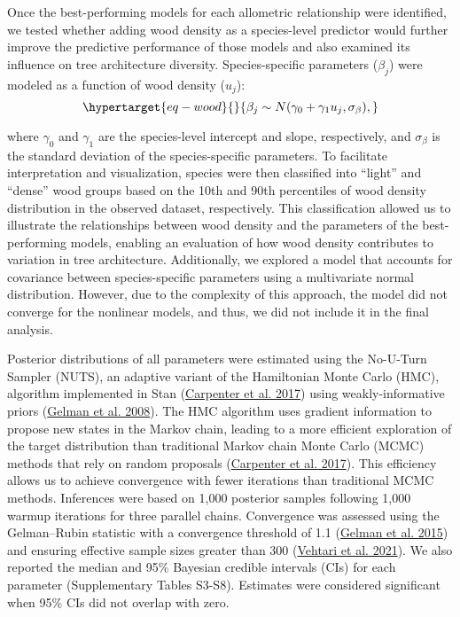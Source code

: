 \documentclass[
  12pt,
  letterpaper,
  DIV=11,
  numbers=noendperiod]{scrartcl}
\begin{document}
Once the best-performing models for each allometric relationship were
identified, we tested whether adding wood density as a species-level
predictor would further improve the predictive performance of those
models and also examined its influence on tree architecture diversity.
Species-specific parameters (\(\beta_j\)) were modeled as a function of
wood density (\(u_j\)): \begin{equation}\protect\hypertarget{eq-wood}{}{
\beta_{j} \sim N(\gamma_{0} + \gamma_{1} u_j, \sigma_{\beta}),
}\label{eq-wood}\end{equation}

where \(\gamma_{0}\) and \(\gamma_{1}\) are the species-level intercept
and slope, respectively, and \(\sigma_{\beta}\) is the standard
deviation of the species-specific parameters. To facilitate
interpretation and visualization, species were then classified into
``light'' and ``dense'' wood groups based on the 10th and 90th
percentiles of wood density distribution in the observed dataset,
respectively. This classification allowed us to illustrate the
relationships between wood density and the parameters of the
best-performing models, enabling an evaluation of how wood density
contributes to variation in tree architecture. Additionally, we explored
a model that accounts for covariance between species-specific parameters
using a multivariate normal distribution. However, due to the complexity
of this approach, the model did not converge for the nonlinear models,
and thus, we did not include it in the final analysis.

Posterior distributions of all parameters were estimated using the
No-U-Turn Sampler (NUTS), an adaptive variant of the Hamiltonian Monte
Carlo (HMC), algorithm implemented in Stan
(\protect\hyperlink{ref-Carpenter2017}{Carpenter et al. 2017}) using
weakly-informative priors (\protect\hyperlink{ref-Gelman2008}{Gelman et
al. 2008}). The HMC algorithm uses gradient information to propose new
states in the Markov chain, leading to a more efficient exploration of
the target distribution than traditional Markov chain Monte Carlo (MCMC)
methods that rely on random proposals
(\protect\hyperlink{ref-Carpenter2017}{Carpenter et al. 2017}). This
efficiency allows us to achieve convergence with fewer iterations than
traditional MCMC methods. Inferences were based on 1,000 posterior
samples following 1,000 warmup iterations for three parallel chains.
Convergence was assessed using the Gelman--Rubin statistic with a
convergence threshold of 1.1 (\protect\hyperlink{ref-Gelman2013}{Gelman
et al. 2015}) and ensuring effective sample sizes greater than 300
(\protect\hyperlink{ref-Vehtari2021}{Vehtari et al. 2021}). We also
reported the median and 95\% Bayesian credible intervals (CIs) for each
parameter (Supplementary Tables S3-S8). Estimates were considered
significant when 95\% CIs did not overlap with zero.
\end{document}
